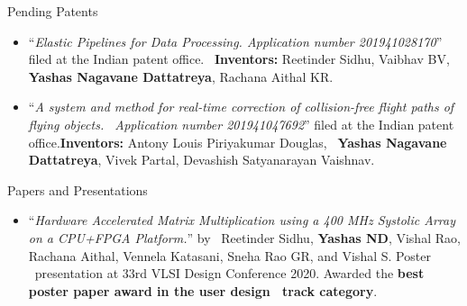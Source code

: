 \documentclass{CV} %
\begin{document}
\begin{rSection}{Pending Patents}

  \begin{itemize}

  \item ``\textit{Elastic Pipelines for Data Processing. Application number 201941028170}'' filed at the Indian patent office. \
    \newline \textbf{Inventors:} Reetinder Sidhu, Vaibhav BV, \textbf{Yashas Nagavane Dattatreya}, Rachana Aithal KR.

  \item ``\textit{A system and method for real-time correction of collision-free flight paths of flying objects. \
    Application number 201941047692}'' filed at the Indian patent office.\newline \textbf{Inventors:} Antony Louis Piriyakumar Douglas, \
    \textbf{Yashas Nagavane Dattatreya}, Vivek Partal, Devashish Satyanarayan Vaishnav.
    
  \end{itemize}
  
\end{rSection}




\begin{rSection}{Papers and Presentations}

  \begin{itemize}

  \item ``\textit{Hardware Accelerated Matrix Multiplication using a 400 MHz Systolic Array on a CPU+FPGA Platform.}'' by \
    Reetinder Sidhu, \textbf{Yashas ND}, Vishal Rao, Rachana Aithal, Vennela Katasani, Sneha Rao GR, and Vishal S. Poster \
    presentation at 33rd VLSI Design Conference 2020. Awarded the \textbf{best poster paper award in the user design \
    track category}.
    
  \end{itemize}
  
\end{rSection}



\end{document}
